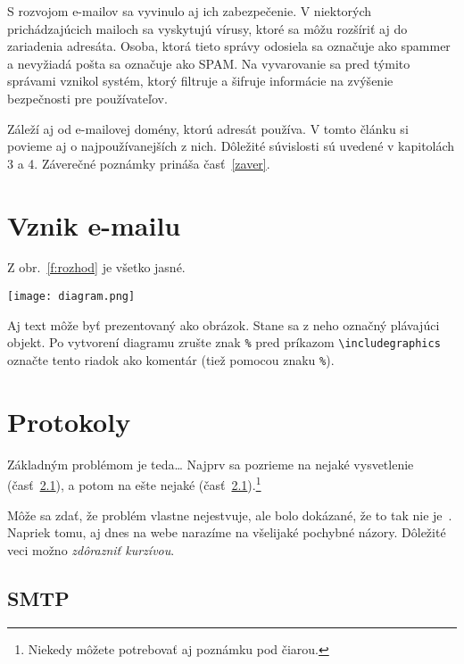 \documentclass[10pt,slovak,twoside,a4paper]{article}
\begin{document}
S rozvojom e-mailov sa vyvinulo aj ich zabezpečenie. V niektorých prichádzajúcich mailoch sa vyskytujú vírusy, ktoré sa môžu rozšíriť aj do zariadenia adresáta. Osoba, ktorá tieto správy odosiela sa označuje ako spammer a nevyžiadá pošta sa označuje ako SPAM. Na vyvarovanie sa pred týmito správami vznikol systém, ktorý filtruje a šifruje informácie na zvýšenie bezpečnosti pre používateľov. 

Záleží aj od e-mailovej domény, ktorú adresát používa. V tomto článku si povieme aj o najpoužívanejších z nich. 
Dôležité súvislosti sú uvedené v kapitolách 3 a 4.
Záverečné poznámky prináša časť~\ref{zaver}.



\section{Vznik e-mailu} \label{nejaka}

Z obr.~\ref{f:rozhod} je všetko jasné. 

\begin{figure*}[tbh]
\centering
  \texttt{[image: diagram.png]}

Aj text môže byť prezentovaný ako obrázok. Stane sa z neho označný plávajúci objekt. Po vytvorení diagramu zrušte znak \texttt{\%} pred príkazom \verb|\includegraphics| označte tento riadok ako komentár (tiež pomocou znaku \texttt{\%}).
\caption{Rozhodujúci argument.}
\label{f:rozhod}
\end{figure*}



\section{Protokoly} \label{ina}

Základným problémom je teda\ldots{} Najprv sa pozrieme na nejaké vysvetlenie (časť~\ref{ina:nejake}), a potom na ešte nejaké (časť~\ref{ina:nejake}).\footnote{Niekedy môžete potrebovať aj poznámku pod čiarou.}

Môže sa zdať, že problém vlastne nejestvuje\cite{Coplien:MPD}, ale bolo dokázané, že to tak nie je~\cite{Czarnecki:Staged, Czarnecki:Progress}. Napriek tomu, aj dnes na webe narazíme na všelijaké pochybné názory\cite{PLP-Framework}. Dôležité veci možno \emph{zdôrazniť kurzívou}.


\subsection{SMTP} \label{ina:nejake}
\end{document}

